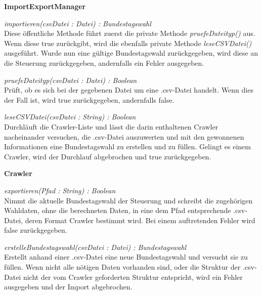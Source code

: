 \documentclass[12pt,a4paper,titlepage]{article}
\newcommand{\myma}{\fontfamily{pcr}\selectfont \textbf}
\newcommand{\mymo}{\fontfamily{pcr}\selectfont \textit}
\begin{document}
\begin{description}
\item{\myma{ImportExportManager}}
\item {\mymo{importieren(csvDatei : Datei) : Bundestagswahl}} \\
Diese öffentliche Methode führt zuerst die private Methode {\mymo{pruefeDateityp()}} aus. Wenn diese true zurückgibt, wird die ebenfalls private Methode {\mymo{leseCSVDatei()}} ausgeführt. Wurde nun eine gültige Bundestagswahl zurückgegeben, wird diese an die Steuerung zurückgegeben, andernfalls ein Fehler ausgegeben.

\item {\mymo{pruefeDateityp(csvDatei : Datei) : Boolean}} \\
Prüft, ob es sich bei der gegebenen Datei um eine .csv-Datei handelt. Wenn dies der Fall ist, wird true zurückgegeben, andernfalls false.

\item {\mymo{leseCSVDatei(csvDatei : String) : Boolean}} \\
Durchläuft die Crawler-Liste und lässt die darin enthaltenen Crawler nacheinander versuchen, die .csv-Datei auszuwerten und mit den gewonnenen Informationen eine Bundestagswahl zu erstellen und zu füllen. Gelingt es einem Crawler, wird der Durchlauf abgebrochen und true zurückgegeben. 

\item{\myma{Crawler}}\\
\item {\mymo{exportieren(Pfad : String) : Boolean}} \\
Nimmt die aktuelle Bundestagswahl der Steuerung und schreibt die zugehörigen Wahldaten, ohne die berechneten Daten, in eine dem Pfad entsprechende .csv-Datei, deren Format Crawler bestimmt wird. Bei einem auftretenden Fehler wird false zurückgegeben.

\item {\mymo{erstelleBundestagswahl(csvDatei : Datei) : Bundestagswahl}} \\
Erstellt anhand einer .csv-Datei eine neue Bundestagswahl und versucht sie zu füllen. Wenn nicht alle nötigen Daten vorhanden sind, oder die Struktur der .csv-Datei nicht der vom Crawler geforderten Struktur entspricht, wird ein Fehler ausgegeben und der Import abgebrochen.
\end{description}

\newpage
\end{document}
